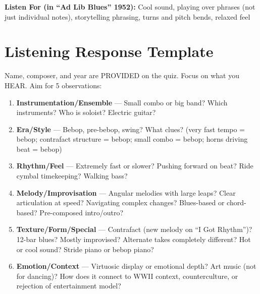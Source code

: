\documentclass[11pt, letterpaper]{article}
\begin{document}
\textbf{Listen For (in ``Ad Lib Blues'' 1952):} Cool sound, playing over phrases (not just individual notes), storytelling phrasing, turns and pitch bends, relaxed feel

\newpage

\section{Listening Response Template}

Name, composer, and year are PROVIDED on the quiz. Focus on what you HEAR. Aim for 5 observations:

\begin{enumerate}
    \item \textbf{Instrumentation/Ensemble} --- Small combo or big band? Which instruments? Who is soloist? Electric guitar?
    \item \textbf{Era/Style} --- Bebop, pre-bebop, swing? What clues? (very fast tempo = bebop; contrafact structure = bebop; small combo = bebop; horns driving beat = bebop)
    \item \textbf{Rhythm/Feel} --- Extremely fast or slower? Pushing forward on beat? Ride cymbal timekeeping? Walking bass?
    \item \textbf{Melody/Improvisation} --- Angular melodies with large leaps? Clear articulation at speed? Navigating complex changes? Blues-based or chord-based? Pre-composed intro/outro?
    \item \textbf{Texture/Form/Special} --- Contrafact (new melody on ``I Got Rhythm'')? 12-bar blues? Mostly improvised? Alternate takes completely different? Hot or cool sound? Stride piano or bebop piano?
    \item \textbf{Emotion/Context} --- Virtuosic display or emotional depth? Art music (not for dancing)? How does it connect to WWII context, counterculture, or rejection of entertainment model?
\end{enumerate}

\noindent{}
\end{document}
